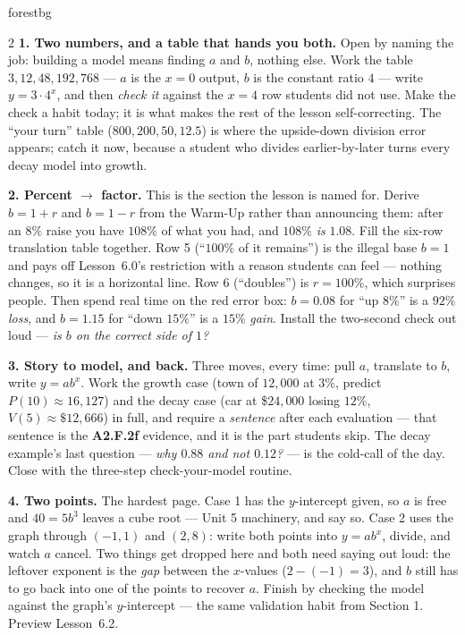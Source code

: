 \documentclass[10pt]{article}
\begin{document}
\begin{skillbox}[Lesson]{forestbg}
\begin{multicols}{2}
\textbf{1. Two numbers, and a table that hands you both.} Open by naming the job: building a model
means finding $a$ and $b$, nothing else. Work the table $3,12,48,192,768$ --- $a$ is the $x=0$
output, $b$ is the constant ratio $4$ --- write $y=3\cdot4^{x}$, and then \emph{check it} against
the $x=4$ row students did not use. Make the check a habit today; it is what makes the rest of the
lesson self-correcting. The ``your turn'' table ($800,200,50,12.5$) is where the upside-down
division error appears; catch it now, because a student who divides earlier-by-later turns every
decay model into growth.

\textbf{2. Percent $\to$ factor.} This is the section the lesson is named for. Derive $b=1+r$ and
$b=1-r$ from the Warm-Up rather than announcing them: after an $8\%$ raise you have $108\%$ of what
you had, and $108\%$ \emph{is} $1.08$. Fill the six-row translation table together. Row 5 (``$100\%$
of it remains'') is the illegal base $b=1$ and pays off Lesson~6.0's restriction with a reason
students can feel --- nothing changes, so it is a horizontal line. Row 6 (``doubles'') is $r=100\%$,
which surprises people. Then spend real time on the red error box: $b=0.08$ for ``up $8\%$'' is a
$92\%$ \emph{loss}, and $b=1.15$ for ``down $15\%$'' is a $15\%$ \emph{gain}. Install the two-second
check out loud --- \emph{is $b$ on the correct side of $1$?}

\columnbreak

\textbf{3. Story to model, and back.} Three moves, every time: pull $a$, translate to $b$, write
$y=ab^{x}$. Work the growth case (town of $12{,}000$ at $3\%$, predict $P(10)\approx16{,}127$) and
the decay case (car at \$$24{,}000$ losing $12\%$, $V(5)\approx\$12{,}666$) in full, and require a
\emph{sentence} after each evaluation --- that sentence is the \textbf{A2.F.2f} evidence, and it is
the part students skip. The decay example's last question --- \emph{why $0.88$ and not $0.12$?} ---
is the cold-call of the day. Close with the three-step check-your-model routine.

\textbf{4. Two points.} The hardest page. Case 1 has the $y$-intercept given, so $a$ is free and
$40=5b^{3}$ leaves a cube root --- Unit 5 machinery, and say so. Case 2 uses the graph through
$(-1,1)$ and $(2,8)$: write both points into $y=ab^{x}$, divide, and watch $a$ cancel. Two things
get dropped here and both need saying out loud: the leftover exponent is the \emph{gap} between the
$x$-values ($2-(-1)=3$), and $b$ still has to go back into one of the points to recover $a$. Finish
by checking the model against the graph's $y$-intercept --- the same validation habit from
Section 1. Preview Lesson~6.2.
\end{multicols}
\end{skillbox}
\end{document}
